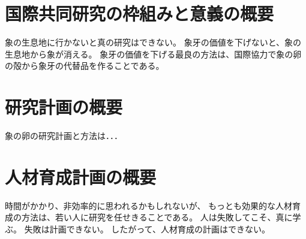 \documentclass[11pt,a4j,dvipdfmx]{jarticle} 					%
\newcommand{\研究課題名}{象の卵}
\newcommand{\研究機関名}{逢坂大学}
\newcommand{\研究代表者氏名}{湯川秀樹}
\begin{document}

\section{国際共同研究の枠組みと意義の概要}

\JSPSInstructions		%
	象の生息地に行かないと真の研究はできない。
	象牙の価値を下げないと、象の生息地から象が消える。
	象牙の価値を下げる最良の方法は、国際協力で象の卵の殻から象牙の代替品を作ることである。




\section{研究計画の概要}

	象の卵の研究計画と方法は．．．
	\vspace*{10zw}	%




\section{人材育成計画の概要}

	時間がかかり、非効率的に思われるかもしれないが、
	もっとも効果的な人材育成の方法は、若い人に研究を任せきることである。
	人は失敗してこそ、真に学ぶ。
	失敗は計画できない。
	したがって、人材育成の計画はできない。


\end{document}
